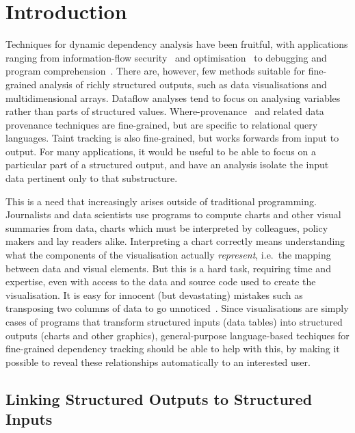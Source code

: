 \section{Introduction}
\label{sec:introduction}

Techniques for dynamic dependency analysis have been fruitful, with applications ranging from information-flow security~\cite{sabelfeld03} and optimisation~\cite{kildall73} to debugging and program comprehension~\cite{weiser81,delucia96}. There are, however, few methods suitable for fine-grained analysis of richly structured outputs, such as data visualisations and multidimensional arrays. Dataflow analyses \cite{reps95} tend to focus on analysing variables rather than parts of structured values. Where-provenance~\cite{buneman01} and related data provenance techniques are fine-grained, but are specific to relational query languages. Taint tracking \cite{newsome05} is also fine-grained, but works forwards from input to output. For many applications, it would be useful to be able to focus on a particular part of a structured output, and have an analysis isolate the input data pertinent only to that substructure.

This is a need that increasingly arises outside of traditional programming. Journalists and data scientists use programs to compute charts and other visual summaries from data, charts which must be interpreted by colleagues, policy makers and lay readers alike. Interpreting a chart correctly means understanding what the components of the visualisation actually \emph{represent}, i.e.~the mapping between data and visual elements. But this is a hard task, requiring time and expertise, even with access to the data and source code used to create the visualisation. It is easy for innocent (but devastating) mistakes such as transposing two columns of data to go unnoticed~\cite{miller06}. Since visualisations are simply cases of programs that transform structured inputs (data tables) into structured outputs (charts and other graphics), general-purpose language-based techiques for fine-grained dependency tracking should be able to help with this, by making it possible to reveal these relationships automatically to an interested user.

\subsection{Linking Structured Outputs to Structured Inputs}
\label{sec:introduction:data-linking}

